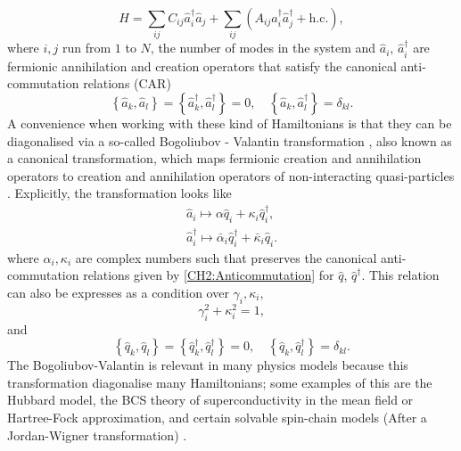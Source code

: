\begin{equation}
\hat{H}=\sum_{i j} C_{i j} \hat{a}_{i}^{\dagger} \hat{a}_{j}+\sum_{i j}\left(A_{i j} \hat{a}_{i}^{\dagger}\hat{a}_{j}^{\dagger}+\mathrm{h.c.}\right),
\label{CH2:QuadraticHamiltonian}
\end{equation}
where $i,j$ run from $1$ to $N$, the number of modes in the system and $\hat{a}_i$, $\hat{a}^{\dagger}_i$ are fermionic annihilation and creation operators that satisfy the canonical anti-commutation relations (CAR) \cite{fradkin_field_1997}
\begin{equation}
\left\{\hat{a}_{k}, \hat{a}_{l}\right\}=\left\{\hat{a}_{k}^{\dagger}, \hat{a}_{l}^{\dagger}\right\}=0, \quad\left\{\hat{a}_{k}, \hat{a}_{l}^{\dagger}\right\}=\delta_{k l}.
\label{CH2:Anticommutation}
\end{equation}
A convenience when working with these kind of Hamiltonians is that they can be diagonalised via a so-called Bogoliubov - Valantin transformation \cite{bogoljubov_new_1958}, also known as a canonical transformation, which maps fermionic creation and annihilation operators to creation and annihilation operators of non-interacting quasi-particles \cite{berezin_method_1966, bogoljubov_new_1958}. Explicitly, the transformation looks like
\begin{equation}
\begin{array}{c}
\hat{a}_{i} \mapsto \alpha \hat{q}_{i}+\kappa_{i} \hat{q}_{i}^{\dagger}, \\
\hat{a}_{i}^{\dagger} \mapsto \bar{\alpha}_{i} \hat{q}_{i}^{\dagger}+\bar{\kappa}_{i} \hat{q}_{i}.
\end{array}
\label{CH2:Bogoliuvov}
\end{equation}
where $\alpha_i , \kappa_i$ are complex numbers such that preserves the canonical anti-commutation relations given by \eqref{CH2:Anticommutation} for $\hat{q}$, $\hat{q}^{\dagger}$. This relation can also be expresses as a condition over $\gamma_i, \kappa_i$,
\begin{equation}
 \gamma_i ^2+ \kappa_i^2 = 1,
\end{equation}
and 
\begin{equation}
	\left\{\hat{q}_{k}, \hat{q}_{l}\right\}=\left\{\hat{q}_{k}^{\dagger}, \hat{q}_{l}^{\dagger}\right\}=0, \quad\left\{\hat{q}_{k}, \hat{q}_{l}^{\dagger}\right\}=\delta_{k l}.
\end{equation}
The Bogoliubov-Valantin is relevant in many physics models because this transformation diagonalise many Hamiltonians; some examples of this are the Hubbard model, the BCS theory of superconductivity in the mean field or Hartree-Fock approximation, and certain solvable spin-chain models (After a Jordan-Wigner transformation) \cite{katsura_statistical_1962, barouch_statistical_1971, barouch_statistical_1970,fradkin_field_1997}.\\
